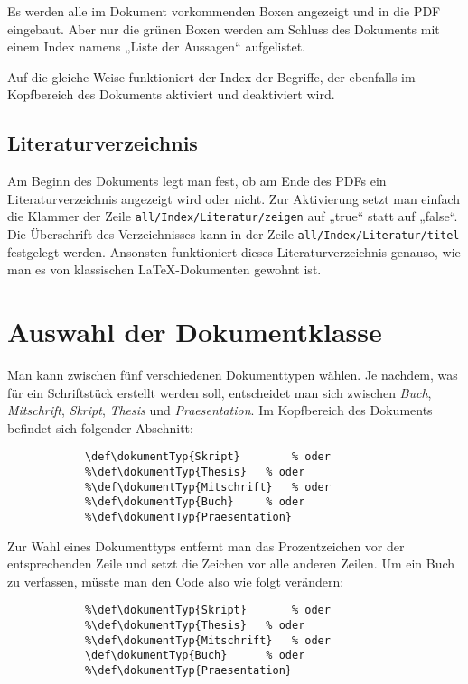 				Es werden alle im Dokument vorkommenden Boxen angezeigt und in die PDF eingebaut. Aber nur die grünen Boxen werden am Schluss des Dokuments mit einem Index namens „Liste der Aussagen“ aufgelistet. 
				
				Auf die gleiche Weise funktioniert der Index der Begriffe, der ebenfalls im Kopfbereich des Dokuments aktiviert und deaktiviert wird. 
				
				
			\subsection{Literaturverzeichnis}
			
				Am Beginn des Dokuments legt man fest, ob am Ende des PDFs ein Literaturverzeichnis angezeigt wird oder nicht. Zur Aktivierung setzt man einfach die Klammer der Zeile \texttt{all/Index/Literatur/zeigen} auf „true“ statt auf „false“. Die Überschrift des Verzeichnisses kann in der Zeile \texttt{all/Index/Literatur/titel} festgelegt werden. Ansonsten funktioniert dieses Literaturverzeichnis genauso, wie man es von klassischen \LaTeX{}-Dokumenten gewohnt ist. 
		
		\section{Auswahl der Dokumentklasse}
		
			Man kann zwischen fünf verschiedenen Dokumenttypen wählen. Je nachdem, was für ein Schriftstück erstellt werden soll, entscheidet man sich zwischen \emph{Buch}, \emph{Mitschrift}, \emph{Skript}, \emph{Thesis} und \emph{Praesentation}. Im Kopfbereich des Dokuments befindet sich folgender Abschnitt: 
			
			\begin{verbatim}
			\def\dokumentTyp{Skript}		% oder
			%\def\dokumentTyp{Thesis}	% oder
			%\def\dokumentTyp{Mitschrift}	% oder
			%\def\dokumentTyp{Buch}		% oder
			%\def\dokumentTyp{Praesentation}
			\end{verbatim}
			
			Zur Wahl eines Dokumenttyps entfernt man das Prozentzeichen vor der entsprechenden Zeile und setzt die Zeichen vor alle anderen Zeilen. Um ein Buch zu verfassen, müsste man den Code also wie folgt verändern: 
			\newpage
			\begin{verbatim}
			%\def\dokumentTyp{Skript}		% oder
			%\def\dokumentTyp{Thesis}	% oder
			%\def\dokumentTyp{Mitschrift}	% oder
			\def\dokumentTyp{Buch}		% oder
			%\def\dokumentTyp{Praesentation}
			\end{verbatim}
			
